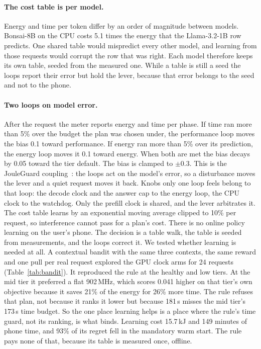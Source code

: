 \documentclass[sigconf, anonymous=false, screen=true]{acmart}
\begin{document}
\paragraph{The cost table is per model.} Energy and time per token differ by an order of magnitude between models. Bonsai-8B on the CPU costs 5.1 times the energy that the Llama-3.2-1B row predicts. One shared table would mispredict every other model, and learning from those requests would corrupt the row that was right. Each model therefore keeps its own table, seeded from the measured one. While a table is still a seed the loops report their error but hold the lever, because that error belongs to the seed and not to the phone.

\paragraph{Two loops on model error.} After the request the meter reports energy and time per phase. If time ran more than 5\% over the budget the plan was chosen under, the performance loop moves the bias 0.1 toward performance. If energy ran more than 5\% over its prediction, the energy loop moves it 0.1 toward energy. When both are met the bias decays by 0.05 toward the tier default. The bias is clamped to $\pm0.3$. This is the JouleGuard coupling~\cite{hoffmann2015jouleguard}: the loops act on the model's error, so a disturbance moves the lever and a quiet request moves it back. Knobs only one loop feels belong to that loop: the decode clock and the answer cap to the energy loop, the CPU clock to the watchdog. Only the prefill clock is shared, and the lever arbitrates it. The cost table learns by an exponential moving average clipped to 10\% per request, so interference cannot pass for a plan's cost. There is no online policy learning on the user's phone. The decision is a table walk, the table is seeded from measurements, and the loops correct it. We tested whether learning is needed at all. A contextual bandit with the same three contexts, the same reward and one pull per real request explored the GPU clock arms for 24 requests (Table~\ref{tab:bandit}). It reproduced the rule at the healthy and low tiers. At the mid tier it preferred a flat 902\,MHz, which scores 0.041 higher on that tier's own objective because it saves 21\% of the energy for 26\% more time. The rule refuses that plan, not because it ranks it lower but because 181\,s misses the mid tier's 173\,s time budget. So the one place learning helps is a place where the rule's time guard, not its ranking, is what binds. Learning cost 15.7\,kJ and 149 minutes of phone time, and 93\% of its regret fell in the mandatory warm start. The rule pays none of that, because its table is measured once, offline.
\end{document}
